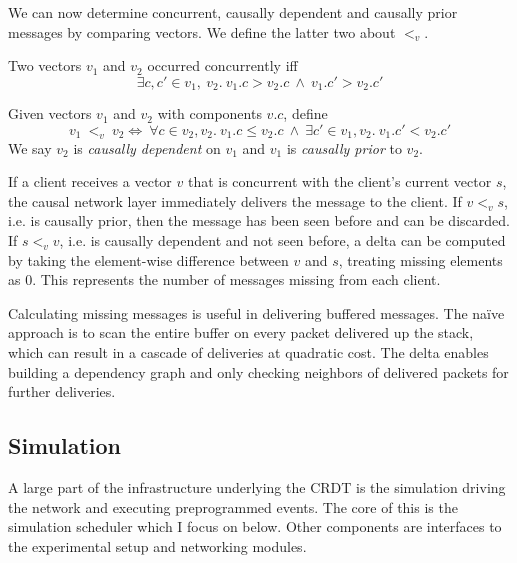 \documentclass[12pt,a4paper,twoside,openright]{report}
\begin{document}
		We can now determine concurrent, causally dependent and causally prior messages by comparing vectors. We define the latter two about $<_v$.
				
		Two vectors $v_1$ and $v_2$ occurred concurrently iff \[\exists c,c' \in v_1,\ v_2.\ v_1.c > v_2.c\ \land\ v_1.c' > v_2.c'\]
		
		Given vectors $v_1$ and $v_2$ with components $v.c$, define \[v_1\ <_v\ v_2 \iff\ \forall c \in v_2, v_2.\ v_1.c \leq v_2.c\ \land\ \exists c' \in v_1, v_2.\ v_1.c' < v_2.c'\]
		We say $v_2$ is \textit{causally dependent} on $v_1$ and $v_1$ is \textit{causally prior} to $v_2$.
		
		If a client receives a vector $v$ that is concurrent with the client's current vector $s$, the causal network layer immediately delivers the message to the client. If $v <_v s$, i.e. is causally prior, then the message has been seen before and can be discarded. If $s <_v v$, i.e. is causally dependent and not seen before, a delta can be computed by taking the element-wise difference between $v$ and $s$, treating missing elements as $0$. This represents the number of messages missing from each client. 
		
		Calculating missing messages is useful in delivering buffered messages. The na\"ive approach is to scan the entire buffer on every packet delivered up the stack, which can result in a cascade of deliveries at quadratic cost. The delta enables building a dependency graph and only checking neighbors of delivered packets for further deliveries.
		
		
	
	
	\subsection{Simulation}
		A large part of the infrastructure underlying the CRDT is the simulation driving the network and executing preprogrammed events. The core of this is the simulation scheduler which I focus on below. Other components are interfaces to the experimental setup and networking modules.
		
\end{document}
